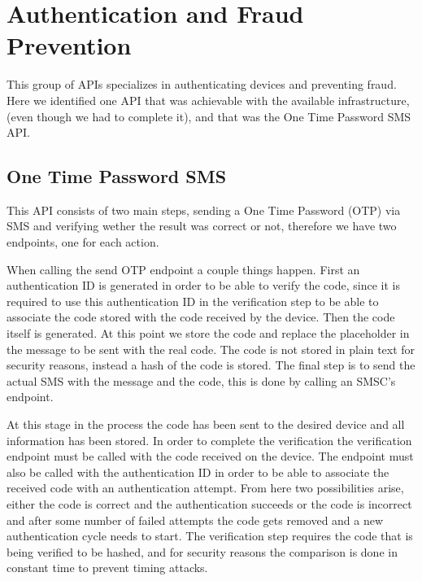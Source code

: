 \section{Authentication and Fraud Prevention}

This group of APIs specializes in authenticating devices and preventing fraud.
Here we identified one API that was achievable with the available
infrastructure, (even though we had to complete it), and that was the One Time
Password SMS API.

\subsection{One Time Password SMS}

This API consists of two main steps, sending a One Time Password (OTP) via SMS
and verifying wether the result was correct or not, therefore we have two
endpoints, one for each action.

When calling the send OTP endpoint a couple things happen. First an
authentication ID is generated in order to be able to verify the code, since it
is required to use this authentication ID in the verification step to be able
to associate the code stored with the code received by the device. Then the
code itself is generated. At this point we store the code and replace the
placeholder in the message to be sent with the real code. The code is not
stored in plain text for security reasons, instead a hash of the code is
stored. The final step is to send the actual SMS with the message and the code,
this is done by calling an SMSC's endpoint.

At this stage in the process the code has been sent to the desired device and
all information has been stored. In order to complete the verification the
verification endpoint must be called with the code received on the device. The
endpoint must also be called with the authentication ID in order to be able to
associate the received code with an authentication attempt. From here two
possibilities arise, either the code is correct and the authentication succeeds
or the code is incorrect and after some number of failed attempts the code gets
removed and a new authentication cycle needs to start. The verification step
requires the code that is being verified to be hashed, and for security reasons
the comparison is done in constant time to prevent timing attacks.
